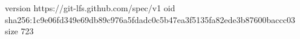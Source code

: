 version https://git-lfs.github.com/spec/v1
oid sha256:1c9e06fd349e69db89c976a5fdadc0c5b47ea3f5135fa82ede3b87600baccc03
size 723
